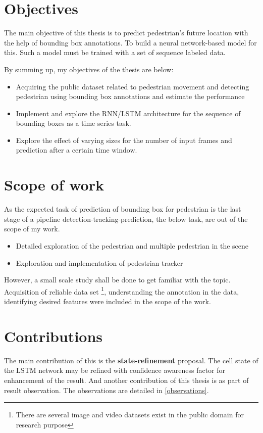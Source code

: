 \section{Objectives}
\newpara The main objective of this thesis is to predict pedestrian's future location with the help of bounding box annotations. To build a neural network-based model for this. Such a model must be trained with a set of sequence labeled data.

By summing up, my objectives of the thesis are below:
\begin{itemize}
	\item  Acquiring the public dataset related to pedestrian movement and detecting pedestrian using bounding box annotations and estimate the performance

	\item Implement and explore the RNN/LSTM architecture for the sequence of bounding boxes as a time series task.
	\item Explore the effect of varying sizes for the number of input frames and prediction after a certain time window.
\end{itemize}

\section{Scope of work}
As the expected task of prediction of bounding box for pedestrian is the last stage of a pipeline detection-tracking-prediction, the below task, are out of the scope of my work.
\begin{itemize}
	\item Detailed exploration of the pedestrian and multiple pedestrian in the scene
	\item Exploration and implementation of pedestrian tracker
\end{itemize}
However, a small scale study shall be done to get familiar with the topic.  Acquisition of reliable data set \footnote{There are several image and video datasets exist in the public domain for research purpose}, understanding the annotation in the data, identifying desired features were included in the scope of the work.

\section{Contributions}
The main contribution of this is the \textbf{state-refinement } proposal. The cell state of the LSTM network may be refined with confidence awareness factor for enhancement of the result. And another contribution of this thesis is as part of result observation. The observations are detailed in \ref{observations}.


